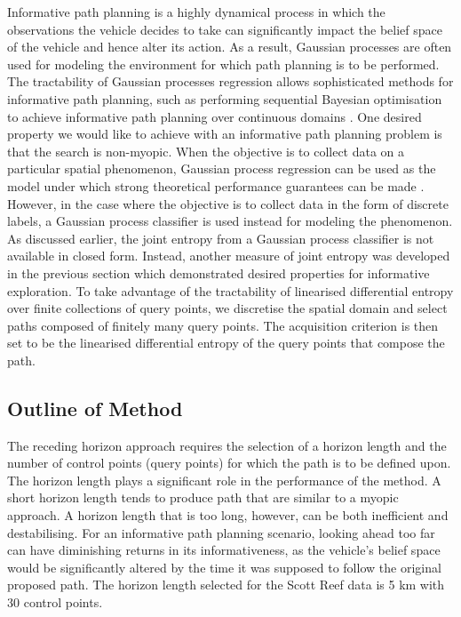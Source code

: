 \documentclass{article}
\begin{document}
		Informative path planning is a highly dynamical process in which the observations the vehicle decides to take can significantly impact the belief space of the vehicle and hence alter its action. As a result, Gaussian processes are often used for modeling the environment for which path planning is to be performed. The tractability of Gaussian processes regression allows sophisticated methods for informative path planning, such as  performing sequential Bayesian optimisation to achieve informative path planning over continuous domains \cite{SequentialBayesianOptimisation}. One desired property we would like to achieve with an informative path planning problem is that the search is non-myopic. When the objective is to collect data on a particular spatial phenomenon, Gaussian process regression can be used as the model under which strong theoretical performance guarantees can be made \cite{Meliou:2007:NIP:1619645.1619742}. However, in the case where the objective is to collect data in the form of discrete labels, a Gaussian process classifier is used instead for modeling the phenomenon. As discussed earlier, the joint entropy from a Gaussian process classifier is not available in closed form. Instead, another measure of joint entropy was developed in the previous section which demonstrated desired properties for informative exploration. To take advantage of the tractability of linearised differential entropy over finite collections of query points, we discretise the spatial domain and select paths composed of finitely many query points. The acquisition criterion is then set to be the linearised differential entropy of the query points that compose the path.

		
	\subsection{Outline of Method}

		The receding horizon approach requires the selection of a horizon length and the number of control points (query points) for which the path is to be defined upon. The horizon length plays a significant role in the performance of the method. A short horizon length tends to produce path that are similar to a myopic approach. A horizon length that is too long, however, can be both inefficient and destabilising. For an informative path planning scenario, looking ahead too far can have diminishing returns in its informativeness, as the vehicle's belief space would be significantly altered by the time it was supposed to follow the original proposed path. The horizon length selected for the Scott Reef data is 5 km with 30 control points.
		
\end{document}

